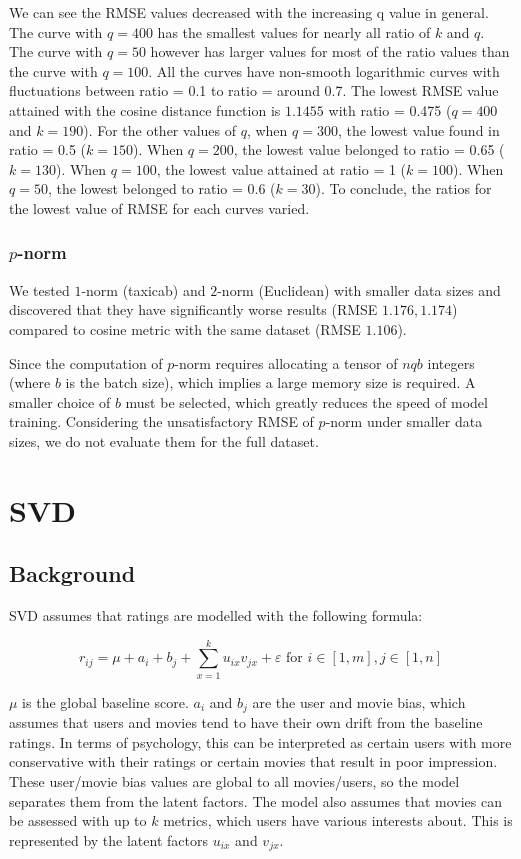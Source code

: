 \documentclass[final]{cvpr}
\begin{document}
We can see the RMSE values decreased with the increasing q value in general.
The curve with $q = 400$ has the smallest values for nearly all ratio of $k$ and $q$.
The curve with $q = 50$ however has larger values for most of the ratio values than the curve with $q = 100$.
All the curves have non-smooth logarithmic curves with fluctuations between ratio = 0.1 to ratio = around 0.7. 
The lowest RMSE value attained with the cosine distance function is $1.1455$ with ratio = 0.475 ($q = 400$ and $k=190$).
For the other values of $q$, when $q = 300$, the lowest value found in ratio = 0.5 ($k = 150$).
When $q = 200$, the lowest value belonged to ratio = 0.65 ($k = 130$).
When $q = 100$, the lowest value attained at ratio = 1 ($k = 100$).
When $q = 50$, the lowest belonged to ratio = 0.6 ($k = 30$).
To conclude, the ratios for the lowest value of RMSE for each curves varied.

\subsubsection{$p$-norm}
We tested $1$-norm (taxicab) and $2$-norm (Euclidean) with smaller data sizes
and discovered that they have significantly worse results (RMSE $1.176, 1.174$)
compared to cosine metric with the same dataset (RMSE $1.106$).

Since the computation of $p$-norm requires allocating a tensor of $nqb$ integers
(where $b$ is the batch size), which implies a large memory size is required.
A smaller choice of $b$ must be selected, which greatly reduces the speed of model training.
Considering the unsatisfactory RMSE of $p$-norm under smaller data sizes,
we do not evaluate them for the full dataset.

\section{\ac{SVD}}
\subsection{Background}
SVD assumes that ratings are modelled with the following formula:

$$ r_{ij} = \mu + a_i + b_j + \sum_{x=1}^k u_{ix} v_{jx} + \varepsilon
\text{ for } i \in [1, m], j \in [1, n] $$

$\mu$ is the global baseline score.
$a_i$ and $b_j$ are the user and movie bias,
which assumes that users and movies tend to have their own drift from the baseline ratings.
In terms of psychology, this can be interpreted as
certain users with more conservative with their ratings
or certain movies that result in poor impression.
These user/movie bias values are global to all movies/users,
so the model separates them from the latent factors.
The model also assumes that movies can be assessed with up to $k$ metrics,
which users have various interests about.
This is represented by the latent factors $u_{ix}$ and $v_{jx}$.
\end{document}
